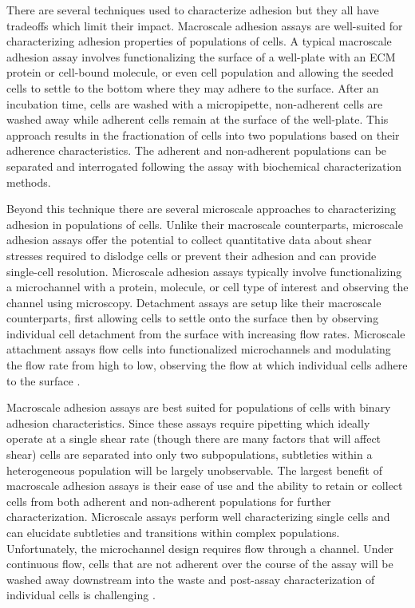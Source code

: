 There are several techniques used to characterize adhesion but they all have tradeoffs which limit their impact. Macroscale adhesion assays are well-suited for characterizing adhesion properties of populations of cells. A typical macroscale adhesion assay involves functionalizing the surface of a well-plate with an ECM protein or cell-bound molecule, or even cell population and allowing the seeded cells to settle to the bottom where they may adhere to the surface. After an incubation time, cells are washed with a micropipette, non-adherent cells are washed away while adherent cells remain at the surface of the well-plate. This approach results in the fractionation of cells into two populations based on their adherence characteristics. The adherent and non-adherent populations can be separated and interrogated following the assay with biochemical characterization methods.

Beyond this technique there are several microscale approaches to characterizing adhesion in populations of cells. Unlike their macroscale counterparts, microscale adhesion assays offer the potential to collect quantitative data about shear stresses required to dislodge cells or prevent their adhesion and can provide single-cell resolution. Microscale adhesion assays typically involve functionalizing a microchannel with a protein, molecule, or cell type of interest and observing the channel using microscopy. Detachment assays are setup like their macroscale counterparts, first allowing cells to settle onto the surface then by observing individual cell detachment from the surface with increasing flow rates. Microscale attachment assays flow cells into functionalized microchannels and modulating the flow rate from high to low, observing the flow at which individual cells adhere to the surface \cite{Yang2013, Lamorte2012}.

Macroscale adhesion assays are best suited for populations of cells with binary adhesion characteristics. Since these assays require pipetting which ideally operate at a single shear rate (though there are many factors that will affect shear) cells are separated into only two subpopulations, subtleties within a heterogeneous population will be largely unobservable. The largest benefit of macroscale adhesion assays is their ease of use and the ability to retain or collect cells from both adherent and non-adherent populations for further characterization. Microscale assays perform well characterizing single cells and can elucidate subtleties and transitions within complex populations. Unfortunately, the microchannel design requires flow through a channel. Under continuous flow, cells that are not adherent over the course of the assay will be washed away downstream into the waste and post-assay characterization of individual cells is challenging \cite{C2IB20036H, Andersson2003, ELPS200305627}. 

